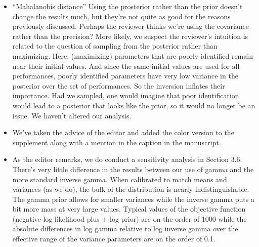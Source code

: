 \documentclass[12pt]{article}
\begin{document}
\begin{itemize}
  
\item ``Mahalanobis distance'' Using the prosterior rather than the prior
  doesn't change the results 
  much, but they're not quite as good for the reasons previously discussed.
  Perhaps the reviewer thinks we're using the covariance rather than the
  precision? More likely, we suspect the reviewer's intuition is related to the
  question of 
  sampling from the 
  posterior rather than maximizing. Here, (maximizing) parameters that are
  poorly identified 
  remain near their initial values. And since the same initial values are used
  for all performances, poorly identified parameters have very low variance in
  the posterior over the set of performances. So the inversion inflates their
  importance. Had we sampled, one 
  would imagine that poor identification would lead to a posterior that looks
  like the prior, so it would no longer be an issue. We haven't altered our
  analysis.

\item We've taken the advice of the editor and added the color version to the
  supplement along with a mention in the caption in the manuscript.

\item As the editor remarks, we do conduct a sensitivity analysis in Section
  3.6. There's very little 
  difference in the results between our use of gamma and the more standard
  inverse gamma. When 
  calibrated to match means and variances (as we do), the bulk of the distribution is
  nearly indistinguishable. The gamma prior allows for smaller variances while
  the inverse gamma 
  puts a bit more mass at very large values. Typical values of the objective
  function (negative log likelihood plus + log prior) are on the order of 1000
  while the absolute differences in log gamma relative to log inverse gamma over
  the effective range of the variance parameters are on the order of 0.1.
  
\end{itemize}
\end{document}
